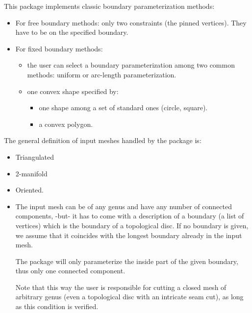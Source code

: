 This package implements classic boundary parameterization methods:
\begin{itemize}

\item For free boundary methods: only two constraints (the pinned
vertices). They have to be on the specified boundary.

\item For fixed boundary methods:

    \begin{itemize}

    \item the user can select a boundary
        parameterization among two common methods: uniform or
        arc-length parameterization.

    \item one convex shape specified by:

        \begin{itemize}

        \item one shape among a set of standard ones (circle, square).

        \item a convex polygon.

        \end{itemize}

    \end{itemize}

\end{itemize}



The general definition of input meshes handled by the package is:

\begin{itemize}

\item Triangulated

\item 2-manifold

\item Oriented.

\item The input mesh can be of any genus and have any number of connected components,
-but- it has to come with a description of a boundary (a list of
vertices) which is the boundary of
a topological disc. If no boundary is given, we assume that it
coincides with the longest boundary already in the input mesh.

The package will only parameterize the inside part of the given boundary,
thus only one connected component.

Note that this way the user is responsible for cutting a closed mesh of
arbitrary genus (even a topological disc with an intricate seam
cut), as long as this condition is verified.

\end{itemize}

